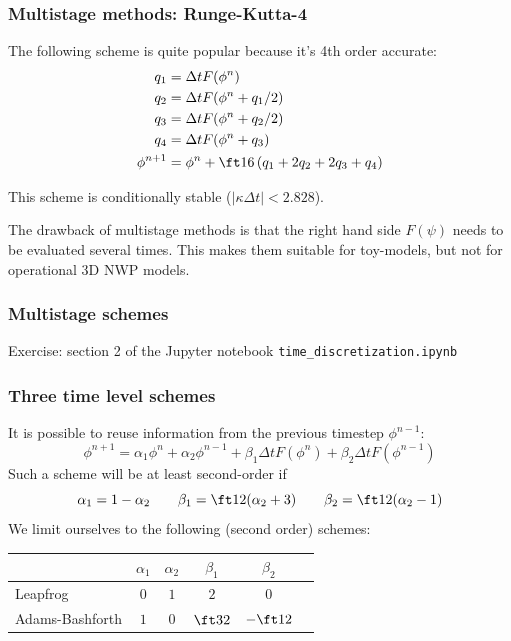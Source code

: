 \documentclass[aspectratio=149,9pt]{beamer}
\begin{document}
%
%
%
\begin{frame}
	\frametitle{Multistage methods: Runge-Kutta-4}
	The following scheme is quite popular because it's 4th order accurate:
	\begin{align*}
		q_1&=\Delta tF(\phi^n)	\\
		q_2&=\Delta tF(\phi^n+q_1/2)	\\
		q_3&=\Delta tF(\phi^n+q_2/2)	\\
		q_4&=\Delta tF(\phi^n+q_3)	\\
		\phi^{n+1}&=\phi^n+\ft16\left(q_1+2q_2+2q_3+q_4\right)
	\end{align*}
	\par
	This scheme is conditionally stable ($|\kappa\Delta t|<2.828$).
	\vspace*{3mm}\par
	The drawback of multistage methods is that the right hand side $F(\psi)$ needs to be evaluated several times. This makes them suitable for toy-models, but not for operational 3D NWP models.
\end{frame}
%
%
\begin{frame}
	\frametitle{Multistage schemes}
	Exercise: section 2 of the Jupyter notebook \texttt{time\_discretization.ipynb}
\end{frame}
%
%
\begin{frame}
	\frametitle{Three time level schemes}
	It is possible to reuse information from the previous timestep $\phi^{n-1}$:
	\begin{equation*}
		\phi^{n+1} = \alpha_1 \phi^n + \alpha_2 \phi^{n-1} + \beta_1 \Delta t F ( \phi^n ) +\beta_2 \Delta t F ( \phi^{n-1} )
	\end{equation*}
	Such a scheme will be at least second-order if
	\begin{equation*}
		\alpha_1 = 1 - \alpha_2 \qquad  \beta_1 = \ft12 ( \alpha_2 +3 ) \qquad  \beta_2 = \ft12 ( \alpha_2 -1 )
	\end{equation*}
	We limit ourselves to the following (second order) schemes:
	\begin{center}
		\def\arraystretch{1.5}
		\begin{tabular}{lccccl}
				&	$\alpha_1$	&	$\alpha_2$	&	$\beta_1$	&	$\beta_2$	\\
			\hline
				Leapfrog & $0$ & $1$ & $2$ & $0$	\\
				Adams-Bashforth & $1$ & $0$ & $\ft32$ & $-\ft12$
		\end{tabular}
	\end{center}
\end{frame}
\end{document}
